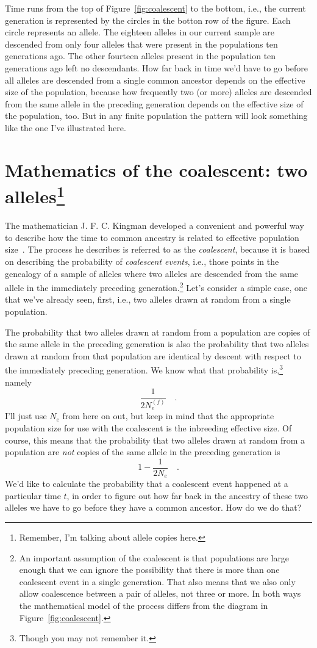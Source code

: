 \documentclass[12pt]{article}
\begin{document}
Time runs from the top of Figure~\ref{fig:coalescent} to the bottom,
i.e., the current generation is represented by the circles in the
botton row of the figure. Each circle represents an allele. The
eighteen alleles in our current sample are descended from only four
alleles that were present in the populations ten generations ago. The
other fourteen alleles present in the population ten generations ago
left no descendants. How far back in time we'd have to go before all
alleles are descended from a single common ancestor depends on the
effective size of the population, because how frequently two (or more)
alleles are descended from the same allele in the preceding generation
depends on the effective size of the population, too. But in any
finite population the pattern will look something like the one I've
illustrated here.

\section*{Mathematics of the coalescent: two
  alleles\footnote{Remember, I'm
  talking about allele copies here.}}

The mathematician J. F. C. Kingman developed a convenient and powerful
way to describe how the time to common ancestry is related to
effective population
size~\cite{Kingman-1982-genealogy,Kingman-1982-coalescent}. The
process he describes is referred to as the {\it coalescent}, because
it is based on describing the probability of {\it coalescent
  events}, i.e., those points in the
genealogy of a sample of alleles where two alleles are descended from
the same allele in the immediately preceding generation.\footnote{An
  important assumption of the coalescent is that populations are large
  enough that we can ignore the possibility that there is more than
  one coalescent event in a single generation. That also means that we
  also only allow coalescence between a pair of alleles, not three or
  more. In both ways the mathematical model of the process differs
  from the diagram in Figure~\ref{fig:coalescent}.}  Let's consider a
simple case, one that we've already seen, first, i.e., two alleles
drawn at random from a single population.

The probability that two alleles drawn at random from a population are
copies of the same allele in the preceding generation is also the
probability that two alleles drawn at random from that population are
identical by descent with respect to the immediately preceding
generation. We know what that probability is,\footnote{Though you may
not remember it.} namely
\[
\frac{1}{2N_e^{(f)}} \quad .
\]
I'll just use $N_e$ from here on out, but keep in mind that the
appropriate population size for use with the coalescent is the
inbreeding effective size. Of course, this means that the probability
that two alleles drawn at random from a population are {\it not\/}
copies of the same allele in the preceding generation is
\[
1 - \frac{1}{2N_e} \quad .
\]
We'd like to calculate the probability that a coalescent event
happened at a particular time $t$, in order to figure out how far back
in the ancestry of these two alleles we have to go before they have a
common ancestor. How do we do that?
\end{document}
